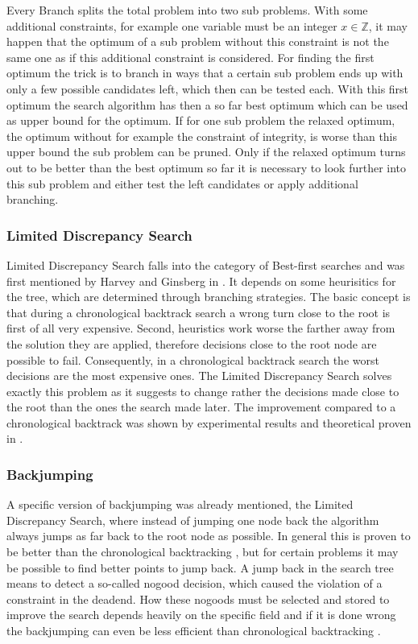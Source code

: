 \documentclass[10pt,
               a4paper,
               journal,
               ]{IEEEtran}
\begin{document}
	Every Branch splits the total problem into two sub problems. With some additional constraints, for example one variable must be an integer $x \in \mathbb{Z}$, it may happen that the optimum of a sub problem without this constraint is not the same one as if this additional constraint is considered. For finding the first optimum the trick is to branch in ways that a certain sub problem ends up with only a few possible candidates left, which then can be tested each. With this first optimum the search algorithm has then a so far best optimum which can be used as upper bound for the optimum. If for one sub problem the relaxed optimum, the optimum without for example the constraint of integrity, is worse than this upper bound the sub problem can be pruned. Only if the relaxed optimum turns out to be better than the best optimum so far it is necessary to look further into this sub problem and either test the left candidates or apply additional branching.
	
	\subsubsection{Limited Discrepancy Search}
	Limited Discrepancy Search falls into the category of Best-first searches and was first mentioned by Harvey and Ginsberg in \cite{limitedDiscrepancy}. It depends on some heurisitics for the tree, which are determined through branching strategies. The basic concept is that during a chronological backtrack search a wrong turn close to the root is first of all very expensive. Second, heuristics work worse the farther away from the solution they are applied, therefore decisions close to the root node are possible to fail. Consequently, in a chronological backtrack search the worst decisions are the most expensive ones. The Limited Discrepancy Search solves exactly this problem as it suggests to change rather the decisions made close to the root than the ones the search made later. The improvement compared to a chronological backtrack was shown by experimental results and theoretical proven in \cite{limitedDiscrepancy}.
	
	\subsubsection{Backjumping}
	A specific version of backjumping was already mentioned, the Limited Discrepancy Search, where instead of jumping one node back the algorithm always jumps as far back to the root node as possible. In general this is proven to be better than the chronological backtracking \cite{limitedDiscrepancy}, but for certain problems it may be possible to find better points to jump back. A jump back in the search tree means to detect a so-called nogood decision, which caused the violation of a constraint in the deadend. How these nogoods must be selected and stored to improve the search depends heavily on the specific field and if it is done wrong the backjumping can even be less efficient than chronological backtracking \cite[p.~100]{handbookCP}.
	
\end{document}
